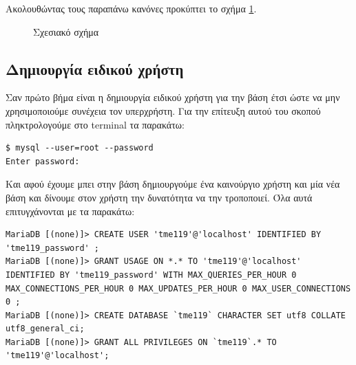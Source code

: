 \documentclass{assignment}
\begin{document}
Ακολουθώντας τους παραπάνω κανόνες προκύπτει το σχήμα \ref{fig:RelationalModel:diagram}.

\begin{landscape}
\begin{figure}
\begin{center}
\caption{Σχεσιακό σχήμα}
\label{fig:RelationalModel:diagram}
\end{center}
\end{figure}
\end{landscape}


\subsection{Δημιουργία ειδικού χρήστη}

Σαν πρώτο βήμα είναι η δημιουργία ειδικού χρήστη για την βάση έτσι ώστε να μην χρησιμοποιούμε συνέχεια τον υπερχρήστη. Για την επίτευξη αυτού του σκοπού πληκτρολογούμε στο terminal τα παρακάτω: 

\begin{verbatim}
$ mysql --user=root --password
Enter password: 
\end{verbatim} 

Και αφού έχουμε μπει στην βάση δημιουργούμε ένα καινούργιο χρήστη και μία νέα βάση και δίνουμε στον χρήστη την δυνατότητα να την τροποποιεί. Όλα αυτά επιτυγχάνονται με τα παρακάτω:

\begin{verbatim}
MariaDB [(none)]> CREATE USER 'tme119'@'localhost' IDENTIFIED BY 'tme119_password' ;
MariaDB [(none)]> GRANT USAGE ON *.* TO 'tme119'@'localhost' IDENTIFIED BY 'tme119_password' WITH MAX_QUERIES_PER_HOUR 0 MAX_CONNECTIONS_PER_HOUR 0 MAX_UPDATES_PER_HOUR 0 MAX_USER_CONNECTIONS 0 ;
MariaDB [(none)]> CREATE DATABASE `tme119` CHARACTER SET utf8 COLLATE utf8_general_ci;
MariaDB [(none)]> GRANT ALL PRIVILEGES ON `tme119`.* TO 'tme119'@'localhost';
\end{verbatim}
\end{document}
